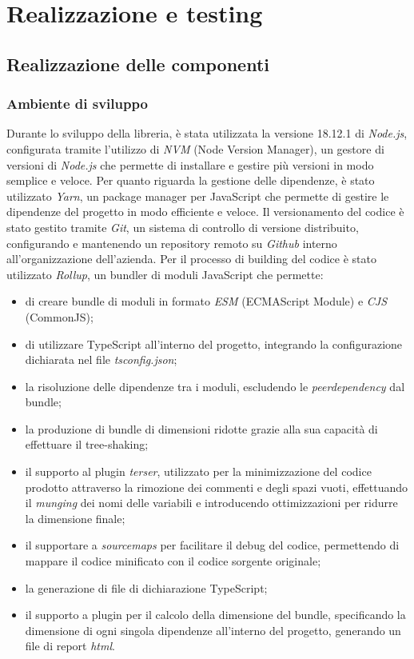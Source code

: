 \chapter{Realizzazione e testing}
\label{chap:realizzazione-testing}

\section{Realizzazione delle componenti}

\subsection{Ambiente di sviluppo}
Durante lo sviluppo della libreria, è stata utilizzata la versione 18.12.1 di \textit{Node.js}, configurata tramite l'utilizzo di \textit{NVM}
(Node Version Manager), un gestore di versioni di \textit{Node.js} che permette di installare e gestire più versioni in modo semplice
e veloce. \newline
Per quanto riguarda la gestione delle dipendenze, è stato utilizzato \textit{Yarn}, un package manager per JavaScript che permette di gestire
le dipendenze del progetto in modo efficiente e veloce. \newline
Il versionamento del codice è stato gestito tramite \textit{Git}, un sistema di controllo di versione distribuito, configurando e
mantenendo un repository remoto su \textit{Github} interno all'organizzazione dell'azienda. \newline
Per il processo di building del codice è stato utilizzato \textit{Rollup}, un bundler di moduli JavaScript che permette:
\begin{itemize}
    \item di creare bundle di moduli in formato \textit{ESM} (ECMAScript Module) e \textit{CJS} (CommonJS);
    \item di utilizzare TypeScript all'interno del progetto, integrando la configurazione dichiarata nel file \textit{tsconfig.json};
    \item la risoluzione delle dipendenze tra i moduli, escludendo le \textit{peerdependency} dal bundle;
    \item la produzione di bundle di dimensioni ridotte grazie alla sua capacità di effettuare il tree-shaking;
    \item il supporto al plugin \textit{terser}, utilizzato per la minimizzazione del codice prodotto attraverso la rimozione dei commenti e degli spazi vuoti,
          effettuando il \textit{munging} dei nomi delle variabili e introducendo ottimizzazioni per ridurre la dimensione finale;
    \item il supportare a \textit{sourcemaps} per facilitare il debug del codice, permettendo di mappare il codice minificato con il codice sorgente originale;
    \item la generazione di file di dichiarazione TypeScript;
    \item il supporto a plugin per il calcolo della dimensione del bundle, specificando la dimensione di ogni singola dipendenze
          all'interno del progetto, generando un file di report \textit{html}.
\end{itemize}
